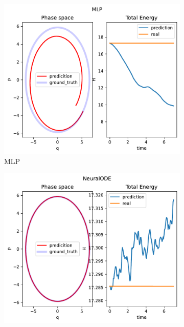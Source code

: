 \begin{figure}[H]

	\centering
	\begin{subfigure}[b]{0.3\textwidth}
		\centering
		\includegraphics[width=\textwidth]{chapters/chapter5/osci_mlp_ps.pdf}
		\caption{MLP}
	\end{subfigure}
	\hfill
	\begin{subfigure}[b]{0.3\textwidth}
		\centering
		\includegraphics[width=\textwidth]{chapters/chapter5/osci_ode_ps.pdf}

\end{subfigure}
\end{figure}
